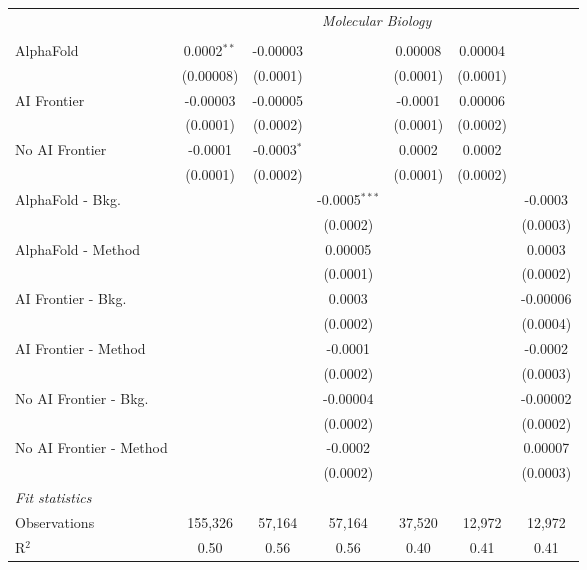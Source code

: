 \begin{tabular}{lcccccc}
 & \multicolumn{6}{c}{\textit{Molecular Biology}} \\ \\
   AlphaFold               & 0.0002$^{**}$ & -0.00003      &                 & 0.00008  & 0.00004  &   \\   
                           & (0.00008)     & (0.0001)      &                 & (0.0001) & (0.0001) &   \\   
   AI Frontier             & -0.00003      & -0.00005      &                 & -0.0001  & 0.00006  &   \\   
                           & (0.0001)      & (0.0002)      &                 & (0.0001) & (0.0002) &   \\   
   No AI Frontier          & -0.0001       & -0.0003$^{*}$ &                 & 0.0002   & 0.0002   &   \\   
                           & (0.0001)      & (0.0002)      &                 & (0.0001) & (0.0002) &   \\   
   AlphaFold - Bkg.        &               &               & -0.0005$^{***}$ &          &          & -0.0003\\   
                           &               &               & (0.0002)        &          &          & (0.0003)\\   
   AlphaFold - Method      &               &               & 0.00005         &          &          & 0.0003\\   
                           &               &               & (0.0001)        &          &          & (0.0002)\\   
   AI Frontier - Bkg.      &               &               & 0.0003          &          &          & -0.00006\\   
                           &               &               & (0.0002)        &          &          & (0.0004)\\   
   AI Frontier - Method    &               &               & -0.0001         &          &          & -0.0002\\   
                           &               &               & (0.0002)        &          &          & (0.0003)\\   
   No AI Frontier - Bkg.   &               &               & -0.00004        &          &          & -0.00002\\   
                           &               &               & (0.0002)        &          &          & (0.0002)\\   
   No AI Frontier - Method &               &               & -0.0002         &          &          & 0.00007\\   
                           &               &               & (0.0002)        &          &          & (0.0003)\\   
   \midrule
   \emph{Fit statistics}\\
   Observations            & 155,326       & 57,164        & 57,164          & 37,520   & 12,972   & 12,972\\  
   R$^2$                   & 0.50          & 0.56          & 0.56            & 0.40     & 0.41     & 0.41\\  
   

\end{tabular}
